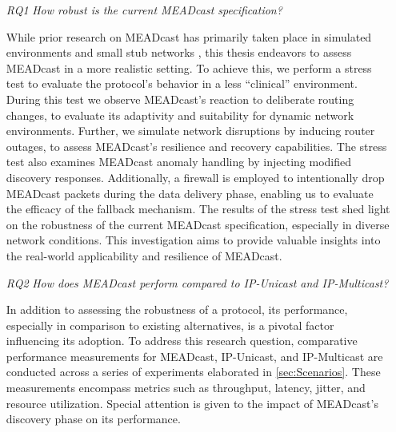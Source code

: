 \begin{enumerate}
    \item[\textit{RQ1}]
        \textit{How robust is the current MEADcast specification?}\par
        While prior research on MEADcast has primarily taken place in simulated
            environments \cite{meadcast1, meadcast2} and small stub networks
            \cite{sdn_ba}, this thesis endeavors to assess MEADcast in a more
            realistic setting.
        To achieve this, we perform a stress test to evaluate the protocol's
            behavior in a less ``clinical'' environment.
        During this test we observe MEADcast's reaction to deliberate routing
            changes, to evaluate its adaptivity and suitability for dynamic
            network environments.
        Further, we simulate network disruptions by inducing router outages, to
            assess MEADcast's resilience and recovery capabilities.
        The stress test also examines MEADcast anomaly handling by injecting
            modified discovery responses.
        Additionally, a firewall is employed to intentionally drop MEADcast
            packets during the data delivery phase, enabling us to evaluate the
            efficacy of the fallback mechanism.
        The results of the stress test shed light on the robustness of the
            current MEADcast specification, especially in diverse network
            conditions.
        This investigation aims to provide valuable insights into the
            real-world applicability and resilience of MEADcast.
    \item[\textit{RQ2}]
        \textit{How does MEADcast perform compared to IP-Unicast and
        IP-Multicast?}\par
        In addition to assessing the robustness of a protocol, its performance,
            especially in comparison to existing alternatives, is a pivotal
            factor influencing its adoption.
        To address this research question, comparative performance measurements
            for MEADcast, IP-Unicast, and IP-Multicast are conducted across a
            series of experiments elaborated in \autoref{sec:Scenarios}.
        These measurements encompass metrics such as throughput, latency,
            jitter, and resource utilization.
        Special attention is given to the impact of MEADcast's discovery phase
            on its performance.

\end{enumerate}
